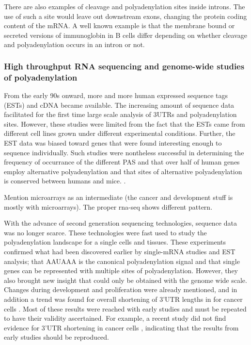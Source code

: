 There are also examples of cleavage and polyadenylation sites inside introns.
The use of such a site would leave out downstream exons, changing the protein
coding content of the mRNA. A well known example is that the membrane bound or
secreted versions of immunoglobin in B cells differ depending on whether
cleavage and polyadenylation occurs in an intron or not.

\subsubsection{High throughput RNA sequencing and genome-wide studies of
polyadenylation}

From the early 90s onward, more and more human expressed sequence tags (ESTs)
and cDNA became available. The increasing amount of sequence data facilitated
for the first time large scale analysis of 3\p UTRs and polyadenylation sites.
However, these studies were limited from the fact that the ESTs came from
different cell lines grown under different experimental conditions. Further,
the EST data was biased toward genes that were found interesting enough to
sequence individually. Such studies were nontheless successful in determining
the frequency of occurrance of the different PAS \cite{beaudoing_patterns_2000}
and that over half of human genes employ alternative polyadenylation and that
sites of alternative polyadenylation is conserved between humans and mice.
\cite{tian_large-scale_2005}.

Mention microarrays as an intermediate (the cancer and development stuff is
mostly with microarrays). The proper rna-seq shows different pattern.

With the advance of second generation sequencing technologies, sequence data
was no longer scarce. These technologies were fast used to study the
polyadenylation landscape for a single cells and tissues. These experiments
confirmed what had been discovered earlier by single-mRNA studies and EST
analysis; that AAUAAA is the canonical polyadenylation signal and that single
genes can be represented with multiple sites of polyadenylation. However, they
also brought new insight that could only be obtained with the genome wide
scale. Changes during development and proliferation were already mentioned, and
in addition a trend was found for overall shortening of 3'UTR lengths in for
cancer cells \cite{mayr_widespread_2009}. Most of these results were
reached with early studies and must be repeated to have their validity
ascertained. For example, a recent study did not find evidence for 3'UTR
shortening in cancer cells \cite{fu_differential_2011}, indicating that the
results from early studies should be reproduced.

